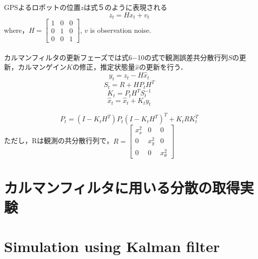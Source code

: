 \documentclass[a4paper]{article}
\begin{document}
%
%
GPSよるロボットの位置$z$は式５のように表現される
\begin{equation}
    z_{t} = Hx_{t} + v_{t}
    \label{eq:5}
\end{equation}
where，$H = \begin{bmatrix} 1 & 0 & 0 \\  0 & 1 & 0 \\  0 & 0 & 1 \end{bmatrix}$, 
$v$ is observation noise. \\ \\
カルマンフィルタの更新フェーズでは式6−10の式で観測誤差共分散行列$S$の更新，カルマンゲイン$K$の修正，推定状態量$\hat{x}$の更新を行う．
\begin{equation}
    y_{t} = z_{t} - H\hat{x}_{t}
    \label{eq:6}
\end{equation}
%
%
\begin{equation}
    S_{t} = R + HP_{t}H^{T}
    \label{eq:7}
\end{equation}
%
%
\begin{equation}
K_{t} = P_{t}H^{T}S_{t}^{-1}
    \label{eq:8}
\end{equation}
\begin{equation}
    \hat{x}_{t} = \hat{x}_{t}+K_{t}y_{t}
    \label{eq:8}
\end{equation}

\begin{equation}
    P_{t} = (I-K_{t}H^{T})P_{t}(I-K_{t}H^{T})^{T} + K_{t}RK_{t}^{T}
    \label{eq:9}
\end{equation}
%
ただし，Rは観測の共分散行列で，$R = \begin{bmatrix} x_{x}^{2} & 0 & 0 \\  0 & x_{y}^{2} & 0 \\  0 & 0 & x_{\theta}^{2} \end{bmatrix}$\\



\section{カルマンフィルタに用いる分散の取得実験}
%
%
%
%
%


\section{Simulation using Kalman filter}
%
%
%
\end{document}
